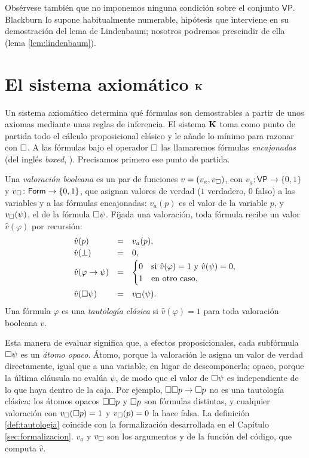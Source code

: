 Obsérvese también que no imponemos ninguna condición sobre el conjunto $\mathsf{VP}$. Blackburn \cite[p.~10]{blackburn} lo supone habitualmente numerable, hipótesis que interviene en su demostración del lema de Lindenbaum; nosotros podremos prescindir de ella (lema \ref{lem:lindenbaum}).

\section{El sistema axiomático \texorpdfstring{$\mathbf{K}$}{K}}\label{sec:sistemaK}

Un sistema axiomático determina qué fórmulas son demostrables a partir de unos axiomas mediante unas reglas de inferencia. El sistema $\mathbf{K}$ toma como punto de partida todo el cálculo proposicional clásico y le añade lo mínimo para razonar con $\square$. A las fórmulas bajo el operador $\square$ las llamaremos fórmulas \emph{encajonadas} (del inglés \emph{boxed}, \cite[pp.~19 y~34]{blackburn}). Precisamos primero ese punto de partida.

\begin{definicion}\label{def:tautologia}
Una \emph{valoración booleana} es un par de funciones $v = (v_a, v_\square)$, con $v_a \colon \mathsf{VP} \to \{0,1\}$ y $v_\square \colon \mathsf{Form} \to \{0,1\}$, que asignan valores de verdad ($1$ verdadero, $0$ falso) a las variables y a las fórmulas encajonadas: $v_a(p)$ es el valor de la variable $p$, y $v_\square(\psi)$, el de la fórmula $\square\psi$. Fijada una valoración, toda fórmula recibe un valor $\hat{v}(\varphi)$ por recursión:
\[
\begin{array}{lcl}
  \hat{v}(p) &=& v_a(p),\\[2pt]
  \hat{v}(\bot) &=& 0,\\[2pt]
  \hat{v}(\varphi \to \psi) &=&
    \begin{cases}
      0 & \text{si } \hat{v}(\varphi) = 1 \text{ y } \hat{v}(\psi) = 0,\\
      1 & \text{en otro caso},
    \end{cases}\\[14pt]
  \hat{v}(\square\psi) &=& v_\square(\psi).
\end{array}
\]
Una fórmula $\varphi$ es una \emph{tautología clásica} si $\hat{v}(\varphi) = 1$ para toda valoración booleana $v$.
\end{definicion}

Esta manera de evaluar significa que, a efectos proposicionales, cada subfórmula $\square\psi$ es un \emph{átomo opaco}. Átomo, porque la valoración le asigna un valor de verdad directamente, igual que a una variable, en lugar de descomponerla; opaco, porque la última cláusula no evalúa $\psi$, de modo que el valor de $\square\psi$ es independiente de lo que haya dentro de la caja. Por ejemplo, $\square\square p \to \square p$ no es una tautología clásica: los átomos opacos $\square\square p$ y $\square p$ son fórmulas distintas, y cualquier valoración con $v_\square(\square p) = 1$ y $v_\square(p) = 0$ la hace falsa. La definición \ref{def:tautologia} coincide con la formalización desarrollada en el Capítulo \ref{sec:formalizacion}. $v_a$ y $v_\square$ son los argumentos  y  de la función  del código, que computa $\hat{v}$.

